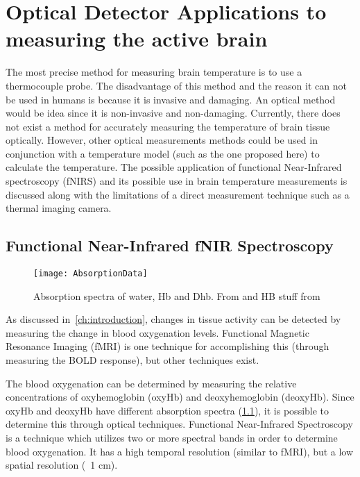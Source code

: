 \chapter{Optical Detector Applications to measuring the active brain}

The most precise method for measuring brain temperature is to use a thermocouple probe.  The disadvantage of this method and the reason it  can not be used in humans is because it is invasive and damaging.  An optical method would be idea since it is non-invasive and non-damaging.  Currently, there does not exist a method for accurately measuring the temperature of brain tissue optically.  However, other optical measurements methods could be used in conjunction with a temperature model (such as the one proposed here) to calculate the temperature.  The possible application of functional Near-Infrared spectroscopy (fNIRS) and its possible use in brain temperature measurements is discussed along with the limitations of a direct measurement technique such as a thermal imaging camera.
  
\section{{F}unctional {N}ear-{I}nfrared {fNIR} Spectroscopy}
\begin{figure}[tb]
  \begin{center}
    \texttt{[image: AbsorptionData]}
    \caption[Absorption spectra of water, deoxyhemoglobin and oxyhemoblogin]{\label{fig:fnirabsorption} Absorption spectra of water, Hb and Dhb.  From \citet{cope} and HB stuff from \citet{horecker} }
  \end{center}
\end{figure}

As discussed in~\cref{ch:introduction}, changes in tissue activity can be detected by measuring the change in blood oxygenation levels.  Functional Magnetic Resonance Imaging (fMRI) is one technique for accomplishing this (through measuring the BOLD response), but other techniques exist.  

The blood oxygenation can be determined by measuring the relative concentrations of oxyhemoglobin (oxyHb) and deoxyhemoglobin (deoxyHb).  Since oxyHb and deoxyHb have different absorption spectra (\cref{fig:fnirabsorption}), it is possible to determine this through optical techniques.  Functional Near-Infrared Spectroscopy is a technique which utilizes two or more spectral bands in order to determine blood oxygenation.  It has a high temporal resolution (similar to fMRI), but a low spatial resolution (~1 cm).

